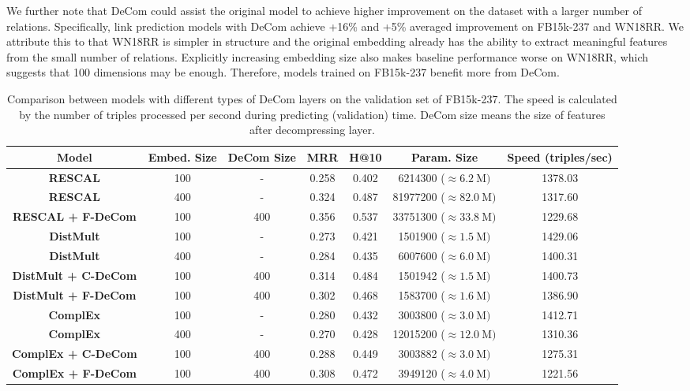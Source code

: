 \documentclass[letterpaper]{article} \usepackage{aaai20}  \usepackage{times}  \usepackage{helvet} \usepackage{courier}  \usepackage{booktabs}
\begin{document}
We further note that DeCom could assist the original model to achieve higher improvement on the dataset with a larger number of relations. Specifically, link prediction models with DeCom achieve +16\% and +5\% averaged improvement on FB15k-237 and WN18RR. We attribute this to that WN18RR is simpler in structure and the original embedding already has the ability to extract meaningful features from the small number of relations. Explicitly increasing embedding size also makes baseline performance worse on WN18RR, which suggests that 100 dimensions may be enough. Therefore, models trained on FB15k-237 benefit more from DeCom.


\begin{table*}[t]
    \centering
    \begin{tabular}{|c|cc|cccc|}
    \toprule
      Model & Embed. Size & DeCom Size & MRR &  H@10 & Param. Size  & Speed (triples/sec)\\
        \midrule
        \textbf{RESCAL} & 100 & - & 0.258 & 0.402 & 6214300 ($\approx 6.2~\textrm{M})$ & 1378.03 \\
        \textbf{RESCAL} & 400 & - & 0.324 & 0.487 & 81977200 ($\approx 82.0~\textrm{M})$ & 1317.60\\
\textbf{RESCAL + F-DeCom} & 100 & 400 & 0.356 & 0.537 & 33751300 ($\approx 33.8~\textrm{M})$ & 1229.68\\
        \midrule
        \textbf{DistMult} & 100 & - & 0.273 & 0.421 & 1501900 ($\approx 1.5~\textrm{M})$ & 1429.06\\
        \textbf{DistMult} & 400 & - & 0.284 & 0.435 & 6007600 ($\approx 6.0~\textrm{M})$ &1400.31\\
        \textbf{DistMult + C-DeCom} & 100 & 400 & 0.314 & 0.484  & 1501942 ($\approx 1.5~\textrm{M})$ & 1400.73\\
        \textbf{DistMult + F-DeCom} & 100 & 400 & 0.302 & 0.468 & 1583700 ($\approx 1.6~\textrm{M})$ & 1386.90\\
        \midrule
        \textbf{ComplEx} & 100 & - & 0.280& 0.432& 3003800 ($\approx 3.0~\textrm{M})$ & 1412.71\\
        \textbf{ComplEx} & 400 & - & 0.270& 0.428& 12015200 ($\approx 12.0~\textrm{M})$ &1310.36\\
        \textbf{ComplEx + C-DeCom} & 100 & 400& 0.288& 0.449& 3003882 ($\approx 3.0~\textrm{M})$ & 1275.31\\
        \textbf{ComplEx + F-DeCom} &  100 & 400 & 0.308 & 0.472 & 3949120 ($\approx 4.0~\textrm{M})$ & 1221.56\\
        \bottomrule
    \end{tabular}
    \caption{Comparison between models with different types of DeCom layers on the validation set of FB15k-237. The speed is calculated by the number of triples processed per second during predicting (validation) time. DeCom size means the size of features after decompressing layer.}
    \label{tab:param-time}
    \vspace{-3mm}
\end{table*}
\end{document}
